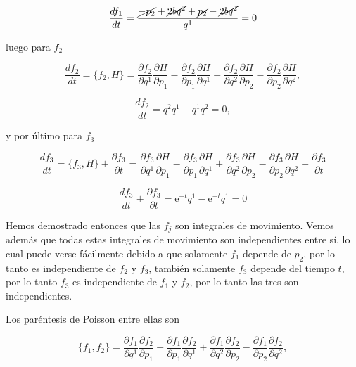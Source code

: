 \documentclass[a4paper,10pt]{article}
\numberwithin{equation}{section}
\newcommand{\euler}{\mathrm{e}}
\begin{document}
\begin{equation}
 \frac{df_1}{dt} = \frac{\cancel{-p_2} + \cancel{2bq^2} + \cancel{p_2} - \cancel{2bq^2}}{q^1} = 0
\end{equation}

luego para $f_2$

\begin{equation}
 \frac{df_2}{dt} = \{f_2,H\} = \frac{\partial f_2}{\partial q^1}\frac{\partial H}{\partial p_1} - 
 \frac{\partial f_2}{\partial p_1}\frac{\partial H}{\partial q^1} +  \frac{\partial f_2}{\partial q^2}\frac{\partial H}{\partial p_2} - 
 \frac{\partial f_2}{\partial p_2}\frac{\partial H}{\partial q^2},
\end{equation}

\begin{equation}
 \frac{df_2}{dt} = q^2q^1 - q^1q^2 = 0,
\end{equation}

y por último para $f_3$

\begin{equation}
\frac{df_3}{dt} = \{f_3,H\} + \frac{\partial f_3}{\partial t} = \frac{\partial f_3}{\partial q^1}\frac{\partial H}{\partial p_1} - 
 \frac{\partial f_3}{\partial p_1}\frac{\partial H}{\partial q^1} +  \frac{\partial f_3}{\partial q^2}\frac{\partial H}{\partial p_2} - 
 \frac{\partial f_3}{\partial p_2}\frac{\partial H}{\partial q^2} + \frac{\partial f_3}{\partial t} 
\end{equation}


\begin{equation}
 \frac{df_3}{dt} + \frac{\partial f_3}{\partial t} = \euler^{-t}q^1 -\euler^{-t}q^1 = 0
\end{equation}

Hemos demostrado entonces que las $f_j$ son integrales de movimiento. Vemos además que 
todas estas integrales de movimiento son independientes entre sí, lo cual puede verse 
fácilmente debido a que solamente $f_1$ depende de $p_2$, por lo tanto es independiente 
de $f_2$ y $f_3$, también solamente $f_3$ depende del tiempo $t$, por lo tanto 
$f_3$ es independiente de $f_1$ y $f_2$, por lo tanto las tres son independientes.

\vspace{.3cm}

Los paréntesis de Poisson entre ellas son

\begin{equation}
 \{f_1,f_2\} = \frac{\partial f_1}{\partial q^1}\frac{\partial f_2}{\partial p_1} - 
 \frac{\partial f_1}{\partial p_1}\frac{\partial f_2}{\partial q^1} +  \frac{\partial f_1}{\partial q^2}\frac{\partial f_2}{\partial p_2} - 
 \frac{\partial f_1}{\partial p_2}\frac{\partial f_2}{\partial q^2},
\end{equation}
\end{document}
